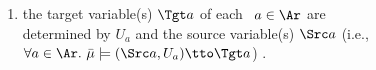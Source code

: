 \begin{defn}[\scibility]
\begin{enumerate}[label=(\alph*),itemsep=0pt,topsep=0.0ex,parsep=0.5ex]
%
\item the target variable(s) $\Tgt a$ of each \arc\ $a \in \Ar$ are\\ determined
    by $U_a$ and the source variable(s) $\Src a$
    \hfill (i.e., $\forall a \in \Ar.~ \bar\mu \models (\Src a, U_a) \tto \Tgt a$)
    \unskip.%
\end{enumerate}



\end{defn}
